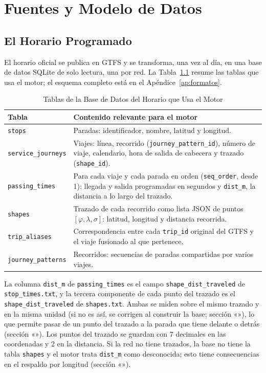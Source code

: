\chapter{Fuentes y Modelo de Datos}
\label{cap:datos}

\section{El Horario Programado}

El horario oficial se publica en GTFS y se transforma, una vez al día, en una base de datos SQLite de solo lectura,
una por red. La Tabla~\ref{tab:esquema} resume las tablas que usa el motor; el esquema completo está en el
Apéndice~\ref{ap:formatos}.

\begin{table}[ht]
\centering
\caption{Tablas de la Base de Datos del Horario que Usa el Motor}\label{tab:esquema}
\begin{tabularx}{\textwidth}{@{}lX@{}}
\toprule
Tabla & Contenido relevante para el motor \\
\midrule
\texttt{stops} & Paradas: identificador, nombre, latitud y longitud. \\
\texttt{service\_journeys} & Viajes: línea, recorrido (\texttt{journey\_pattern\_id}), número de viaje, calendario,
  hora de salida de cabecera y trazado (\texttt{shape\_id}). \\
\texttt{passing\_times} & Para cada viaje y cada parada en orden (\texttt{seq\_order}, desde 1): llegada y salida
  programadas en segundos y \texttt{dist\_m}, la distancia a lo largo del trazado. \\
\texttt{shapes} & Trazado de cada recorrido como lista JSON de puntos $[\varphi,\lambda,\sigma]$: latitud, longitud y
  distancia recorrida. \\
\texttt{trip\_aliases} & Correspondencia entre cada \texttt{trip\_id} original del GTFS y el viaje fusionado al que
  pertenece. \\
\texttt{journey\_patterns} & Recorridos: secuencias de paradas compartidas por varios viajes. \\
\bottomrule
\end{tabularx}
\end{table}

La columna \texttt{dist\_m} de \texttt{passing\_times} es el campo
\texttt{shape\_dist\_traveled} de \texttt{stop\_times.txt}, y la tercera componente de cada punto del trazado es el
\texttt{shape\_dist\_traveled} de \texttt{shapes.txt}. Ambas se miden sobre el mismo trazado y en la misma unidad (si no es
así, se corrigen al construir la base; sección «»), lo que permite pasar de un punto del trazado a la parada que tiene delante o detrás (sección «»). Los
puntos del trazado se guardan con 7 decimales en las coordenadas y 2 en la distancia. Si la red no tiene trazados, la
base no tiene la tabla \texttt{shapes} y el motor trata \texttt{dist\_m} como desconocida; esto tiene consecuencias en
el respaldo por longitud (sección «»).

